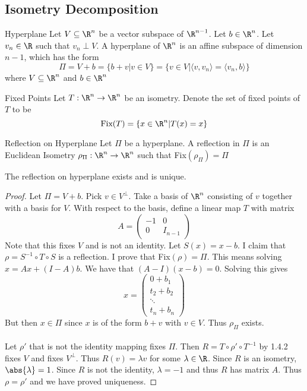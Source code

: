 \subsection{Isometry Decomposition}
\begin{defn}{Hyperplane}{} Let $V\subseteq\R^n$ be a vector subspace of $\R^{n-1}$. Let $b\in\R^n$. Let $v_n\in\R$ such that $v_n\perp V$. A hyperplane of $\R^n$ is an affine subspace of dimension $n-1$, which has the form $$\Pi=V+b=\{b+v|v\in V\}=\{v\in V|\langle v,v_n\rangle=\langle v_n,b\rangle\}$$ where $V\subseteq\R^n$ and $b\in\R^n$
\end{defn}

\begin{defn}{Fixed Points}{} Let $T:\R^n\to\R^n$ be an isometry. Denote the set of fixed points of $T$ to be $$\text{Fix}(T)=\{x\in\R^n|T(x)=x\}$$
\end{defn}

\begin{defn}{Reflection on Hyperplane}{} Let $\Pi$ be a hyperplane. A reflection in $\Pi$ is an Euclidean Isometry $\rho_\Pi:\R^n\to\R^n$ such that Fix$(\rho_\Pi)=\Pi$
\end{defn}

\begin{prp}{}{} The reflection on hyperplane exists and is unique. \tcbline
\begin{proof} Let $\Pi=V+b$. Pick $v\in V^\perp$. Take a basis of $\R^n$ consisting of $v$ together with a basis for $V$. With respect to the basis, define a linear map $T$ with matrix $$A=\begin{pmatrix}
-1 & 0\\
0 & I_{n-1}
\end{pmatrix}$$
Note that this fixes $V$ and is not an identity. Let $S(x)=x-b$. I claim that $\rho=S^{-1}\circ T\circ S$ is  a reflection. I prove that Fix$(\rho)=\Pi$. This means solving $x=Ax+(I-A)b$. We have that $(A-I)(x-b)=0$. Solving this gives $$x=\begin{pmatrix}
0+b_1\\
t_2+b_2\\
\ddots\\
t_n+b_n
\end{pmatrix}$$
But then $x\in\Pi$ since $x$ is of the form $b+v$ with $v\in V$. Thus $\rho_\Pi$ exists. \\~\\
Let $\rho'$ that is not the identity mapping fixes $\Pi$. Then $R=T\circ\rho'\circ T^{-1}$ by 1.4.2 fixes $V$ and fixes $V^\perp$. Thus $R(v)=\lambda v$ for some $\lambda\in\R$. Since $R$ is an isometry, $\abs{\lambda}=1$. Since $R$ is not the identity, $\lambda=-1$ and thus $R$ has matrix $A$. Thus $\rho=\rho'$ and we have proved uniqueness. 
\end{proof}
\end{prp}

